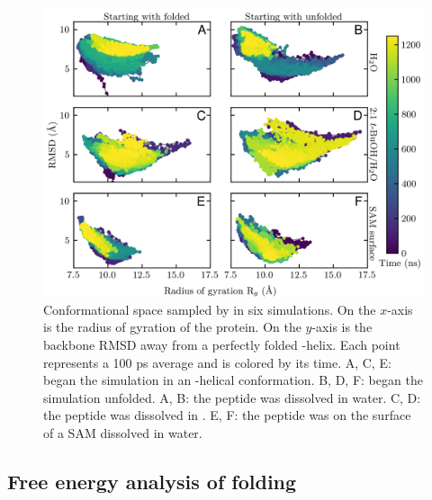\begin{figure}
    \center
    \includegraphics[width=\double]{figures-helix/combined_rgyr_v_rmsd.png}
    \caption[Conformational space sampled by \pep{} in three different solvents]{
        Conformational space sampled by \pep{} in six simulations. 
        On the $x$-axis is the radius of gyration of the protein. 
        On the $y$-axis is the backbone RMSD away from a perfectly folded \textalpha{}-helix. 
        Each point represents a 100 ps average and is colored by its time. 
        A, C, E: \pep{} began the simulation in an \textalpha{}-helical conformation. 
        B, D, F: \pep{} began the simulation unfolded. 
        A, B: the peptide was dissolved in water. 
        C, D: the peptide was dissolved in \tbawat{}. 
        E, F: the peptide was on the surface of a SAM dissolved in water.
    }
    \label{fig:helix-rgyr_v_rmsd}
\end{figure}

\subsection{Free energy analysis of folding}

